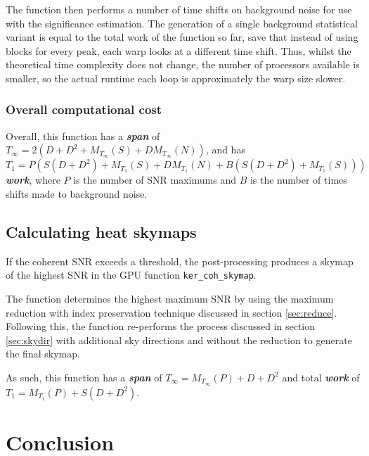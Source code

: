 \documentclass{article}
\begin{document}
%
The function then performs a number of time shifts on background noise for use with the significance estimation.
The generation of a single background statistical variant is equal to the total work of the function so far, save that instead of using blocks for every peak, each warp looks at a different time shift.
Thus, whilst the theoretical time complexity does not change, the number of processors available is smaller, so the actual runtime each loop is approximately the warp size slower.

\subsubsection{Overall computational cost} \label{sec:versatile_cost}

Overall, this function has a \textit{\textbf{span}} of \(T_\infty = 2(D + D^2 + M_{T_\infty}(S) + DM_{T_\infty}(N))\), and has \(T_1 = P(S(D + D^2) + M_{T_1}(S) + DM_{T_1}(N) + B(S(D + D^2) + M_{T_1}(S)))\) \textit{\textbf{work}}, where \(P\) is the number of SNR maximums and \(B\) is the number of times shifts made to background noise.

\subsection{Calculating heat skymaps} \label{sec:coh_skymap}

If the coherent SNR exceeds a threshold, the post-processing produces a skymap of the highest SNR in the GPU function \texttt{ker\_coh\_skymap}.

The function determines the highest maximum SNR by using the maximum reduction with index preservation technique discussed in section \ref{sec:reduce}.
Following this, the function re-performs the process discussed in section \ref{sec:skydir} with additional sky directions and without the reduction to generate the final skymap.

As such, this function has a \textit{\textbf{span}} of \(T_\infty = M_{T_\infty}(P) + D + D^2\) and total \textit{\textbf{work}} of \(T_1 = M_{T_1}(P) + S(D + D^2)\).

\section{Conclusion} \label{sec:conclusion}
\end{document}
